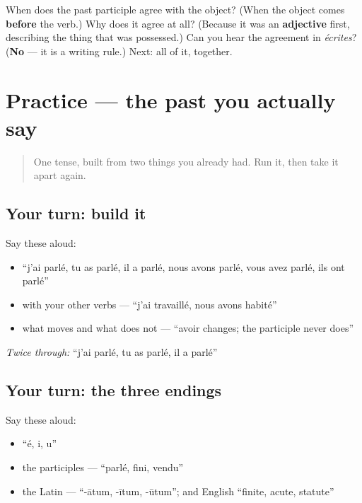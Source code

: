 \begin{tcolorbox}[breakable,colback=teal!4,colframe=teal!35!black,title={Before you move on}]
When does the past participle agree with the object? (When the object comes \textbf{before} the verb.) Why does it agree at all? (Because it was an \textbf{adjective} first, describing the thing that was possessed.) Can you hear the agreement in \emph{écrites}? (\textbf{No} — it is a writing rule.) Next: all of it, together.
\end{tcolorbox}
\section[Practice]{Practice — the past you actually say}

\label{lesson:FR-C15-practice-compose}



\begin{quote}
One tense, built from two things you already had. Run it, then take it apart again.
\end{quote}

\subsection*{Your turn: build it}
Say these aloud:

\begin{itemize}
\raggedright
  \item \textquotedblleft{}j'ai parlé, tu as parlé, il a parlé, nous avons parlé, vous avez parlé, ils ont parlé\textquotedblright{}
  \item with your other verbs — \textquotedblleft{}j'ai travaillé, nous avons habité\textquotedblright{}
  \item what moves and what does not — \textquotedblleft{}avoir changes; the participle never does\textquotedblright{}
\end{itemize}

\emph{Twice through:} \textquotedblleft{}j'ai parlé, tu as parlé, il a parlé\textquotedblright{}

\subsection*{Your turn: the three endings}
Say these aloud:

\begin{itemize}
\raggedright
  \item \textquotedblleft{}é, i, u\textquotedblright{}
  \item the participles — \textquotedblleft{}parlé, fini, vendu\textquotedblright{}
  \item the Latin — \textquotedblleft{}-ātum, -ītum, -ūtum\textquotedblright{}; and English \textquotedblleft{}finite, acute, statute\textquotedblright{}
\end{itemize}

